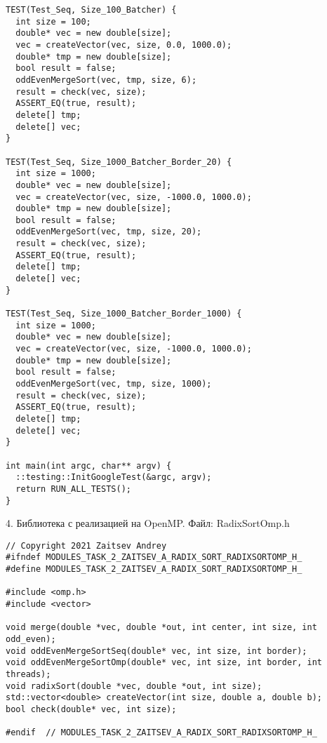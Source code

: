 \documentclass{report}
\begin{document}
\begin{lstlisting}
TEST(Test_Seq, Size_100_Batcher) {
  int size = 100;
  double* vec = new double[size];
  vec = createVector(vec, size, 0.0, 1000.0);
  double* tmp = new double[size];
  bool result = false;
  oddEvenMergeSort(vec, tmp, size, 6);
  result = check(vec, size);
  ASSERT_EQ(true, result);
  delete[] tmp;
  delete[] vec;
}

TEST(Test_Seq, Size_1000_Batcher_Border_20) {
  int size = 1000;
  double* vec = new double[size];
  vec = createVector(vec, size, -1000.0, 1000.0);
  double* tmp = new double[size];
  bool result = false;
  oddEvenMergeSort(vec, tmp, size, 20);
  result = check(vec, size);
  ASSERT_EQ(true, result);
  delete[] tmp;
  delete[] vec;
}

TEST(Test_Seq, Size_1000_Batcher_Border_1000) {
  int size = 1000;
  double* vec = new double[size];
  vec = createVector(vec, size, -1000.0, 1000.0);
  double* tmp = new double[size];
  bool result = false;
  oddEvenMergeSort(vec, tmp, size, 1000);
  result = check(vec, size);
  ASSERT_EQ(true, result);
  delete[] tmp;
  delete[] vec;
}

int main(int argc, char** argv) {
  ::testing::InitGoogleTest(&argc, argv);
  return RUN_ALL_TESTS();
}
\end{lstlisting}

\par 4. Библиотека с реализацией на OpenMP. Файл: RadixSortOmp.h
\begin{lstlisting}
// Copyright 2021 Zaitsev Andrey
#ifndef MODULES_TASK_2_ZAITSEV_A_RADIX_SORT_RADIXSORTOMP_H_
#define MODULES_TASK_2_ZAITSEV_A_RADIX_SORT_RADIXSORTOMP_H_

#include <omp.h>
#include <vector>

void merge(double *vec, double *out, int center, int size, int odd_even);
void oddEvenMergeSortSeq(double* vec, int size, int border);
void oddEvenMergeSortOmp(double* vec, int size, int border, int threads);
void radixSort(double *vec, double *out, int size);
std::vector<double> createVector(int size, double a, double b);
bool check(double* vec, int size);

#endif  // MODULES_TASK_2_ZAITSEV_A_RADIX_SORT_RADIXSORTOMP_H_
\end{lstlisting}
\end{document}
